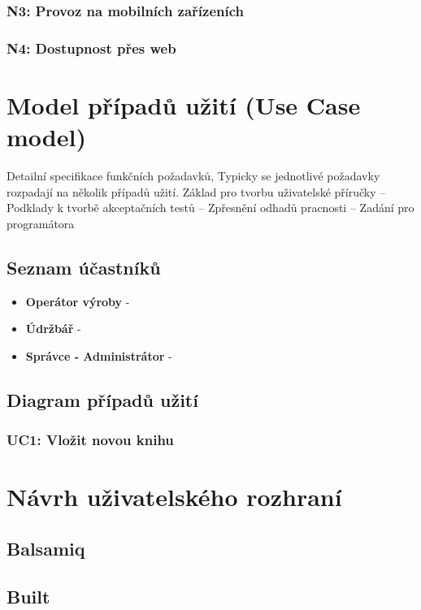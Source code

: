 \documentclass[thesis=M,czech]{FITthesis}[2012/06/26]
\begin{document}
\subsubsection{N3: Provoz na mobilních zařízeních}
\subsubsection{N4: Dostupnost přes web}

\section{Model případů užití (Use Case model)}
Detailní specifikace funkčních požadavků, Typicky se jednotlivé požadavky rozpadají na několik případů užití. Základ pro tvorbu uživatelské příručky
– Podklady k tvorbě akceptačních testů
– Zpřesnění odhadů pracnosti
– Zadání pro programátora


\subsection{Seznam účastníků}

\begin{itemize}
	\item
	\textbf{Operátor výroby} - 
	\item
	\textbf{Údržbář} - 
	\item
	\textbf{Správce - Administrátor} - 
\end{itemize} 	

\subsection{Diagram případů užití}

\subsubsection{UC1: Vložit novou knihu}

\section{Návrh uživatelského rozhraní}

\subsection{Balsamiq}

\subsection{Built}
\end{document}
